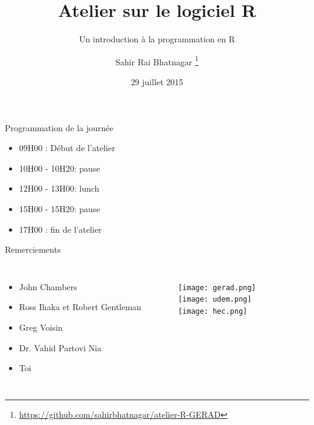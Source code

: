 \documentclass[11pt]{beamer}\usepackage[]{graphicx}\usepackage[]{color}
\begin{document}
\title[Atelier sur le logiciel R]{Atelier sur le logiciel R}
\subtitle{Un introduction \`{a} la programmation en R}

\author[]{Sahir Rai Bhatnagar%
\thanks{\href{https://github.com/sahirbhatnagar/atelier-R-GERAD}{https://github.com/sahirbhatnagar/atelier-R-GERAD}%
}}

\date{29 juillet 2015}


\maketitle

\begin{frame}{Programmation de la journée}
\begin{itemize}
\item 09H00 : Début de l'atelier
\item 10H00 - 10H20: pause
\item 12H00 - 13H00: lunch
\item 15H00 -  15H20: pause
\item 17H00 : fin de l'atelier
\end{itemize}
\end{frame}



\begin{frame}{Remerciements}
\begin{columns}[c] %


\begin{itemize}
\item John Chambers
\item Ross Ihaka et Robert Gentleman
\item Greg Voisin
\item Dr. Vahid Partovi Nia
\item Toi
\end{itemize}

\begin{figure}
\texttt{[image: gerad.png]}\\[2mm]
\texttt{[image: udem.png]}\\[5mm]
\texttt{[image: hec.png]}
\end{figure}

\end{columns}
\end{frame}
\end{document}
